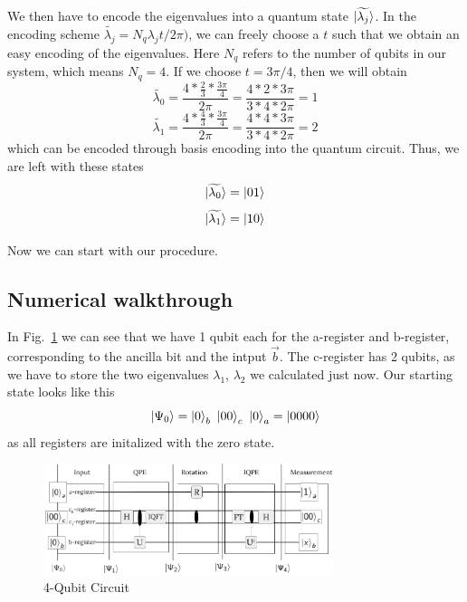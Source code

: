We then have to encode the eigenvalues into a quantum state $\ket{\widetilde{\lambda_j}}$.
In the encoding scheme $\widetilde{\lambda_j} = N_q\lambda_jt/2\pi)$, we can freely choose a $t$ such that we obtain an easy encoding of the eigenvalues. 
Here $N_q$ refers to the number of qubits in our system, which means $N_q = 4$.
If we choose $t = 3\pi/4$, then we will obtain
\begin{equation}
\widetilde{\lambda_0} =\frac{4*\frac{2}{3}*\frac{3\pi}{4}}{2 \pi} =\frac{4*2*3\pi}{3*4* 2 \pi} = 1
\end{equation}
\begin{equation}
\widetilde{\lambda_1} =\frac{4*\frac{4}{3}*\frac{3\pi}{4}}{2 \pi} =\frac{4*4*3\pi}{3*4* 2 \pi} = 2
\end{equation}
which can be encoded through basis encoding into the quantum circuit.
Thus, we are left with these states
\begin{equation}
\ket{\widetilde{\lambda_0}} = \ket{01}
\end{equation}
\begin{equation}
\ket{\widetilde{\lambda_1}} = \ket{10}
\end{equation}

Now we can start with our procedure.

\subsection{Numerical walkthrough}

In Fig.~\ref{ex_circ_numerical} we can see that we have 1 qubit each for the a-register and b-register, corresponding to the ancilla bit and the intput $\vec b$.
The c-register has 2 qubits, as we have to store the two eigenvalues $\lambda_1$, $\lambda_2$ we calculated just now.
Our starting state looks like this
\begin{equation}
\ket{\Psi_0} = \ket{0}_b\ \ket{00}_c\ \ket{0}_a = \ket{0000}
\end{equation}
as all registers are initalized with the zero state.


\begin{figure}
    \centering
    \includegraphics[width=8.5cm]{img/example_circuit_4_qubit_cropped.png}
    \caption{4-Qubit Circuit}
    \label{ex_circ_numerical}
\end{figure}





